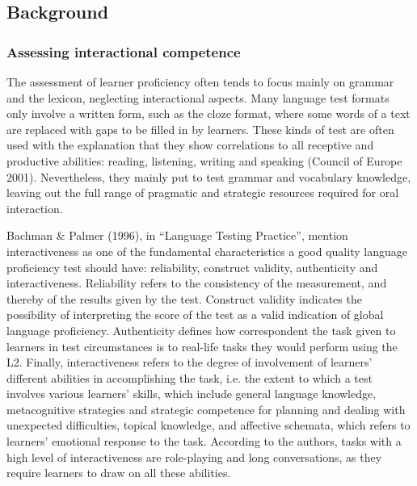 \subsection{Background}
\hypertarget{Toc191305924}{}\subsubsection{Assessing interactional competence}
\hypertarget{Toc191305925}{}\begin{styleStandard}
The assessment of learner proficiency often tends to focus mainly on grammar and the lexicon, neglecting interactional aspects. Many language test formats only involve a written form, such as the cloze format, where some words of a text are replaced with gaps to be filled in by learners. These kinds of test are often used with the explanation that they show correlations to all receptive and productive abilities: reading, listening, writing and speaking (Council of Europe 2001). Nevertheless, they mainly put to test grammar and vocabulary knowledge, leaving out the full range of pragmatic and strategic resources required for oral interaction.
\end{styleStandard}

\begin{styleStandard}
Bachman \& Palmer (1996), in “Language Testing Practice”, mention interactiveness as one of the fundamental characteristics a good quality language proficiency test should have: reliability, construct validity, authenticity and interactiveness. Reliability refers to the consistency of the measurement, and thereby of the results given by the test. Construct validity indicates the possibility of interpreting the score of the test as a valid indication of global language proficiency. Authenticity defines how correspondent the task given to learners in test circumstances is to real-life tasks they would perform using the L2. Finally, interactiveness refers to the degree of involvement of learners’ different abilities in accomplishing the task, i.e. the extent to which a test involves various learners’ skills, which include general language knowledge, metacognitive strategies and strategic competence for planning and dealing with unexpected difficulties, topical knowledge, and affective schemata, which refers to learners’ emotional response to the task. According to the authors, tasks with a high level of interactiveness are role-playing and long conversations, as they require learners to draw on all these abilities.
\end{styleStandard}

